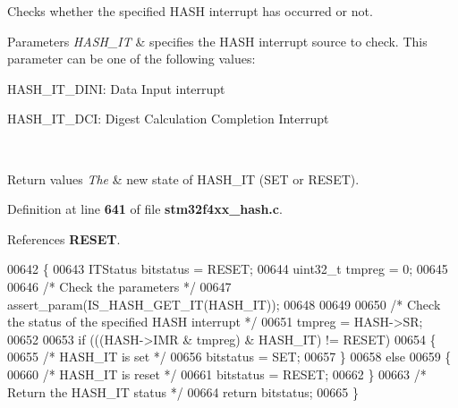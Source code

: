 Checks whether the specified H\+A\+SH interrupt has occurred or not. 


\begin{DoxyParams}{Parameters}
{\em H\+A\+S\+H\+\_\+\+IT} & specifies the H\+A\+SH interrupt source to check. This parameter can be one of the following values\+: \begin{DoxyItemize}
\item H\+A\+S\+H\+\_\+\+I\+T\+\_\+\+D\+I\+NI\+: Data Input interrupt \item H\+A\+S\+H\+\_\+\+I\+T\+\_\+\+D\+CI\+: Digest Calculation Completion Interrupt \end{DoxyItemize}
\\
\hline
\end{DoxyParams}

\begin{DoxyRetVals}{Return values}
{\em The} & new state of H\+A\+S\+H\+\_\+\+IT (S\+ET or R\+E\+S\+ET). \\
\hline
\end{DoxyRetVals}


Definition at line \textbf{ 641} of file \textbf{ stm32f4xx\+\_\+hash.\+c}.



References \textbf{ R\+E\+S\+ET}.


\begin{DoxyCode}
00642 \{
00643   ITStatus bitstatus = RESET;
00644   uint32\_t tmpreg = 0;
00645 
00646   \textcolor{comment}{/* Check the parameters */}
00647   assert_param(IS_HASH_GET_IT(HASH\_IT));  
00648 
00649 
00650   \textcolor{comment}{/* Check the status of the specified HASH interrupt */}
00651   tmpreg =  HASH->SR;
00652 
00653   \textcolor{keywordflow}{if} (((HASH->IMR & tmpreg) & HASH\_IT) != RESET)
00654   \{
00655     \textcolor{comment}{/* HASH\_IT is set */}
00656     bitstatus = SET;
00657   \}
00658   \textcolor{keywordflow}{else}
00659   \{
00660     \textcolor{comment}{/* HASH\_IT is reset */}
00661     bitstatus = RESET;
00662   \}
00663   \textcolor{comment}{/* Return the HASH\_IT status */}
00664   \textcolor{keywordflow}{return} bitstatus;
00665 \}
\end{DoxyCode}
\mbox{\label{group__HASH__Group5_gaed111ba67a4f4afc8c9cf389adc574ac}} 
